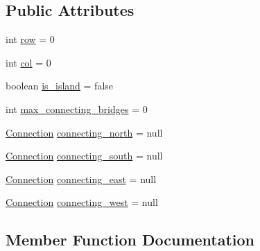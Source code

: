 \subsection*{Public Attributes}
\begin{DoxyCompactItemize}
\item 
int \mbox{\hyperlink{class_island__and___bridges_1_1_hashi_1_1_board_element_adbd3017109d248020dcd93474c99ad60}{row}} = 0
\item 
int \mbox{\hyperlink{class_island__and___bridges_1_1_hashi_1_1_board_element_a6f5fc040b8e73ea25a3c3e0865563f43}{col}} = 0
\item 
boolean \mbox{\hyperlink{class_island__and___bridges_1_1_hashi_1_1_board_element_a5cf9fb068a5f73f0250be9dbeec6330c}{is\+\_\+island}} = false
\item 
int \mbox{\hyperlink{class_island__and___bridges_1_1_hashi_1_1_board_element_a85e0de84a1fa4dc0b8bb4bbc7563d706}{max\+\_\+connecting\+\_\+bridges}} = 0
\item 
\mbox{\hyperlink{class_island__and___bridges_1_1_hashi_1_1_connection}{Connection}} \mbox{\hyperlink{class_island__and___bridges_1_1_hashi_1_1_board_element_ae28dcddbea0bb620c9776a90edc76732}{connecting\+\_\+north}} = null
\item 
\mbox{\hyperlink{class_island__and___bridges_1_1_hashi_1_1_connection}{Connection}} \mbox{\hyperlink{class_island__and___bridges_1_1_hashi_1_1_board_element_aa16e777e3beeb69cd4c397415c3d544d}{connecting\+\_\+south}} = null
\item 
\mbox{\hyperlink{class_island__and___bridges_1_1_hashi_1_1_connection}{Connection}} \mbox{\hyperlink{class_island__and___bridges_1_1_hashi_1_1_board_element_a5caef69d0e541dc0d96c2089f1d7b988}{connecting\+\_\+east}} = null
\item 
\mbox{\hyperlink{class_island__and___bridges_1_1_hashi_1_1_connection}{Connection}} \mbox{\hyperlink{class_island__and___bridges_1_1_hashi_1_1_board_element_a9ed714e02440e1bb9d9afbe9bd07f82e}{connecting\+\_\+west}} = null
\end{DoxyCompactItemize}


\subsection{Member Function Documentation}
\mbox{\label{class_island__and___bridges_1_1_hashi_1_1_board_element_a815ee8cb7478381ad3398c07e0a14d3b}} 
